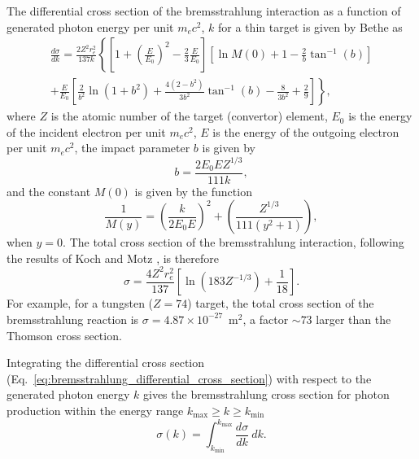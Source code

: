 \documentclass[../main.tex]{subfiles}
\begin{document}
The differential cross section of the bremsstrahlung interaction as a function of generated photon energy per unit $m_{e}c^{2}$, $k$ for a thin target is given by Bethe \cite{bethe1934influence,koch1959bremsstrahlung} as 
\begin{multline}
\frac{d\sigma}{dk} = \frac{2Z^{2}r_{e}^{2}}{137k}\left\{\left[1+\left(\frac{E}{E_{0}}\right)^{2}-\frac{2}{3}\frac{E}{E_{0}}\right]\left[\ln{M\left(0\right)}+1-\frac{2}{b}\tan^{-1}\left(b\right) \right] \right.\\\left. +\frac{E}{E_{0}}\left[\frac{2}{b^{2}}\ln\left(1+b^{2}\right)+\frac{4\left(2-b^{2}\right)}{3b^{2}}\tan^{-1}\left(b\right)-\frac{8}{3b^{2}}+\frac{2}{9}\right]\right\},
\label{eq:bremsstrahlung_differential_cross_section}
\end{multline}
where $Z$ is the atomic number of the target (convertor) element, $E_{0}$ is the energy of the incident electron per unit $m_{e}c^{2}$, $E$ is the energy of the outgoing electron per unit $m_{e}c^{2}$, the impact parameter $b$ is given by 
\begin{equation}
b = \frac{2E_{0}EZ^{1/3}}{111k},
\label{eq:b_impact_parameter}    
\end{equation}
and the constant $M\left(0\right)$ \cite{schiff1951energy} is given by the function
\begin{equation}
\frac{1}{M\left(y\right)} = \left(\frac{k}{2E_{0}E}\right)^{2}+\left(\frac{Z^{1/3}}{111\left(y^{2}+1\right)}\right),
\label{eq:M0_Schiff}    
\end{equation}
when $y=0$. The total cross section of the bremsstrahlung interaction, following the results of Koch and Motz \cite{koch1959bremsstrahlung}, is therefore
\begin{equation}
\sigma = \frac{4Z^{2}r_{e}^{2}}{137}\left[\ln\left(183Z^{-1/3}\right)+\frac{1}{18}\right].
\label{eq:brem_total_cross_section}    
\end{equation}
For example, for a tungsten ($Z = 74$) target, the total cross section of the bremsstrahlung reaction is $\sigma = 4.87\times 10^{-27}$~\si{\meter}$^{2}$, a factor $\sim 73$ larger than the Thomson cross section. 

Integrating the differential cross section (Eq.~\ref{eq:bremsstrahlung_differential_cross_section}) with respect to the generated photon energy $k$ gives the bremsstrahlung cross section for photon production within the energy range $k_{\mathrm{max}} \geq k \geq k_{\mathrm{min}}$ 
\begin{equation}
\sigma\left(k\right) = \int_{k_{\mathrm{min}}}^{k_\mathrm{max}} \frac{d\sigma}{dk}~dk.
\label{eq:brem_integrated_cross_section}    
\end{equation}
\end{document}

